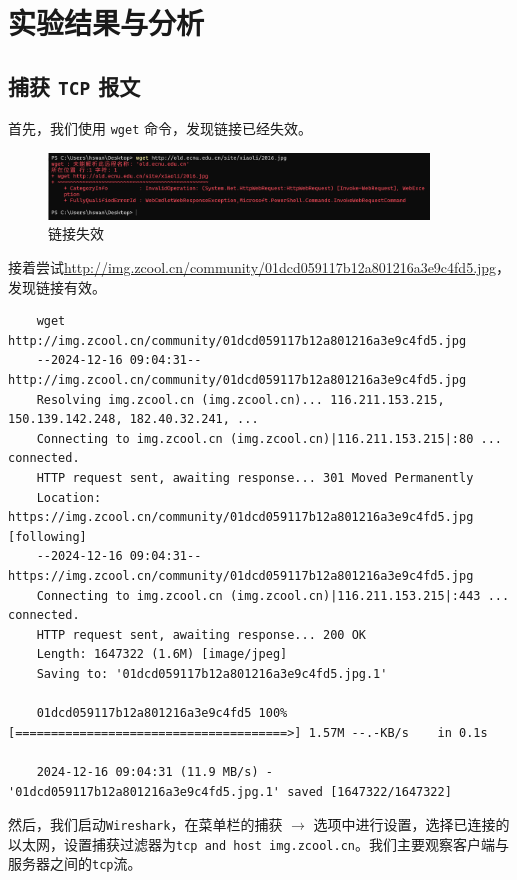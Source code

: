 \documentclass{article}
\begin{document}
\section{实验结果与分析}

\subsection{捕获 \texttt{TCP} 报文}

首先，我们使用 \texttt{wget} 命令，发现链接已经失效。

\begin{figure}[H]
  \centering
  \includegraphics[width=0.9\textwidth]{img/1.png}
  \caption{链接失效}
\end{figure}

接着尝试\url{http://img.zcool.cn/community/01dcd059117b12a801216a3e9c4fd5.jpg}，发现链接有效。

\begin{lstlisting}
	wget http://img.zcool.cn/community/01dcd059117b12a801216a3e9c4fd5.jpg
	--2024-12-16 09:04:31--  http://img.zcool.cn/community/01dcd059117b12a801216a3e9c4fd5.jpg
	Resolving img.zcool.cn (img.zcool.cn)... 116.211.153.215, 150.139.142.248, 182.40.32.241, ...
	Connecting to img.zcool.cn (img.zcool.cn)|116.211.153.215|:80 ... connected.
	HTTP request sent, awaiting response... 301 Moved Permanently
	Location: https://img.zcool.cn/community/01dcd059117b12a801216a3e9c4fd5.jpg [following]
	--2024-12-16 09:04:31--  https://img.zcool.cn/community/01dcd059117b12a801216a3e9c4fd5.jpg
	Connecting to img.zcool.cn (img.zcool.cn)|116.211.153.215|:443 ... connected.
	HTTP request sent, awaiting response... 200 OK
	Length: 1647322 (1.6M) [image/jpeg]
	Saving to: '01dcd059117b12a801216a3e9c4fd5.jpg.1'
	
	01dcd059117b12a801216a3e9c4fd5 100%[======================================>] 1.57M --.-KB/s    in 0.1s
	
	2024-12-16 09:04:31 (11.9 MB/s) - '01dcd059117b12a801216a3e9c4fd5.jpg.1' saved [1647322/1647322]
\end{lstlisting}

然后，我们启动\texttt{Wireshark}，在菜单栏的捕获 \( \to \) 选项中进行设置，选择已连接的以太网，设置捕获过滤器为\texttt{tcp and host img.zcool.cn}。我们主要观察客户端与服务器之间的\texttt{tcp}流。
\end{document}
